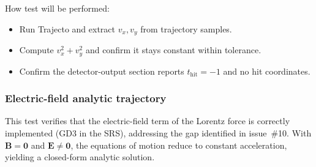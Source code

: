 \documentclass[12pt, titlepage]{article}
\begin{document}
\begin{enumerate}
How test will be performed:
\begin{itemize}
  \item Run Trajecto and extract $v_x, v_y$ from trajectory samples.
  \item Compute $v_x^2+v_y^2$ and confirm it stays constant within tolerance.
  \item Confirm the detector-output section reports $t_{\mathrm{hit}}=-1$ and
  no hit coordinates.
\end{itemize}

\end{enumerate}

\subsubsection{Electric-field analytic trajectory}

This test verifies that the electric-field term of the Lorentz force is
correctly implemented (GD3 in the SRS), addressing the gap identified in
issue~\#10.  With $\mathbf{B}=\mathbf{0}$ and $\mathbf{E}\neq\mathbf{0}$, the
equations of motion reduce to constant acceleration, yielding a closed-form
analytic solution.
\end{document}
